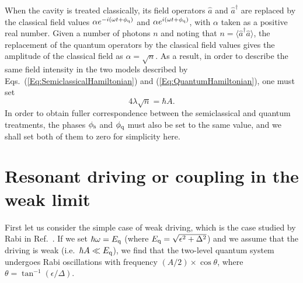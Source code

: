 \documentclass[aps,twocolumn,superscriptaddress]{revtex4}
\begin{document}
When the cavity is treated classically, its field operators $\hat{a}$ and $\hat{a}^{\dagger}$ are replaced by the classical field values $\alpha e^{-i(\omega t + \phi_{\rm q})}$ and $\alpha e^{i(\omega t + \phi_{\rm q})}$, with $\alpha$ taken as a positive real number. Given a number of photons $n$ and noting that $n=\langle \hat{a}^{\dagger} \hat{a} \rangle$, the replacement of the quantum operators by the classical field values gives the amplitude of the classical field as $\alpha=\sqrt{n}$. As a result, in order to describe the same field intensity in the two models described by Eqs.~(\ref{Eq:SemiclassicalHamiltonian}) and (\ref{Eq:QuantumHamiltonian}), one must set
%
\begin{equation}
4\lambda\sqrt{n}=\hbar A.
%
\label{Eq:SemiclassicalQuantumFieldCorrespondence}
\end{equation}
%
In order to obtain fuller correspondence between the semiclassical and quantum treatments, the phases $\phi_{\rm s}$ and $\phi_{\rm q}$ must also be set to the same value, and we shall set both of them to zero for simplicity here.



\section{Resonant driving or coupling in the weak limit}
\label{Sec:WeakDrivingCoupling}

First let us consider the simple case of weak driving, which is the case studied by Rabi in Ref.~\cite{Rabi}. If we set $\hbar\omega=E_{\rm q}$ (where $E_{\rm q}=\sqrt{\epsilon^2+\Delta^2}$) and we assume that the driving is weak (i.e.~$\hbar A\ll E_{\rm q}$), we find that the two-level quantum system undergoes Rabi oscillations with frequency $(A/2)\times\cos\theta$, where $\theta=\tan^{-1}\left(\epsilon/\Delta\right)$.
\end{document}
